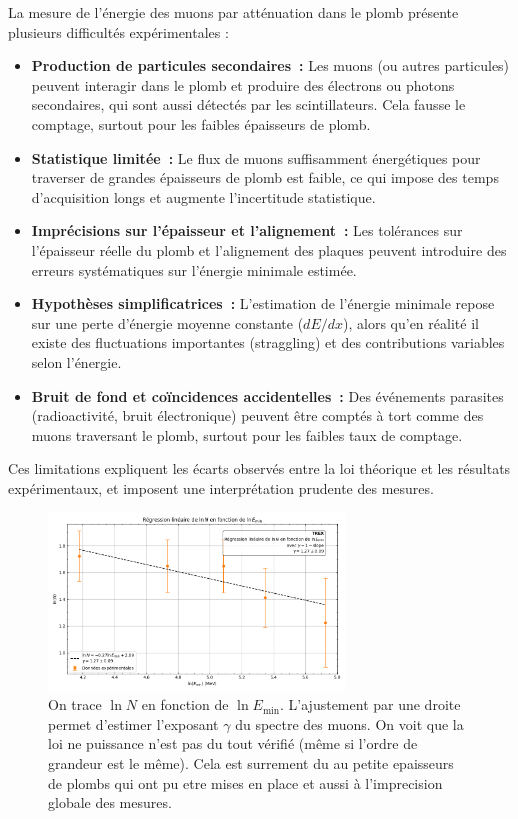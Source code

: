 \documentclass[a4paper,12pt,twoside]{article}
\begin{document}
\begin{center}
\begin{tcolorbox}[colback=red!5!white, colframe=red!80!black, title=Problèmes et limitations de la mesure de l'énergie des muons cosmiques]
La mesure de l’énergie des muons par atténuation dans le plomb présente plusieurs difficultés expérimentales :
\begin{itemize}
    \item \textbf{Production de particules secondaires~:} Les muons (ou autres particules) peuvent interagir dans le plomb et produire des électrons ou photons secondaires, qui sont aussi détectés par les scintillateurs. Cela fausse le comptage, surtout pour les faibles épaisseurs de plomb.
    \item \textbf{Statistique limitée~:} Le flux de muons suffisamment énergétiques pour traverser de grandes épaisseurs de plomb est faible, ce qui impose des temps d’acquisition longs et augmente l’incertitude statistique.
    \item \textbf{Imprécisions sur l’épaisseur et l’alignement~:} Les tolérances sur l’épaisseur réelle du plomb et l’alignement des plaques peuvent introduire des erreurs systématiques sur l’énergie minimale estimée.
    \item \textbf{Hypothèses simplificatrices~:} L’estimation de l’énergie minimale repose sur une perte d’énergie moyenne constante ($dE/dx$), alors qu’en réalité il existe des fluctuations importantes (straggling) et des contributions variables selon l’énergie.
    \item \textbf{Bruit de fond et coïncidences accidentelles~:} Des événements parasites (radioactivité, bruit électronique) peuvent être comptés à tort comme des muons traversant le plomb, surtout pour les faibles taux de comptage.
\end{itemize}
Ces limitations expliquent les écarts observés entre la loi théorique et les résultats expérimentaux, et imposent une interprétation prudente des mesures.
\end{tcolorbox}
\end{center}

\begin{figure}[!h]
  \centering
  \includegraphics[width=0.7\textwidth]{Images/plot_gamma.png}
  \caption{On trace $\ln N$ en fonction de $\ln E_{\min}$. L’ajustement par une droite permet d’estimer l’exposant $\gamma$ du spectre des muons.
  On voit que la loi ne puissance n'est pas du tout vérifié (même si l'ordre de grandeur est le même). Cela est surrement du au petite epaisseurs de plombs qui ont pu etre mises en place et aussi à l'imprecision globale des mesures.}
  \label{fig:energie_fit}
\end{figure}
\end{document}
